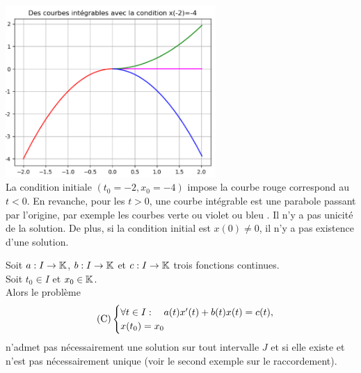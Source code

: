 \documentclass{book}
\begin{document}
\begin{Exemple}
\begin{center}
\includegraphics[width=8cm]{C7_equation_differentielle_raccord3.png}\\
La condition initiale $(t_0=-2,x_0=-4)$ impose la courbe rouge correspond au $t<0$. En revanche, pour les $t>0$, une courbe intégrable est une parabole passant par l'origine, par exemple les courbes verte ou violet ou bleu . Il n'y a pas unicité de la solution.  De plus, si la condition initial est $x(0)\neq 0$, il n'y a pas existence d'une solution. 
\end{center}
\end{Exemple}
\begin{Proposition}
Soit $a:I\to \mathbb{K}     $,  $b:I\to\mathbb{K}     $ et $c:I\to\mathbb{K}     $ trois fonctions continues.\\
Soit $t_0\in I$ et $x_0\in \mathbb{K}$.\\
Alors le problème 
\[\tag{$\mathrm{C}$}
  \begin{cases}
    \forall t\in I:\quad a(t)x'(t) + b(t) x(t) = c(t), \\
    x(t_0) = x_0
\end{cases}\]
n'admet pas nécessairement une solution sur tout intervalle $J$ et si elle existe et n'est pas nécessairement unique (voir le second exemple sur le raccordement).
\end{Proposition}
\end{document}
